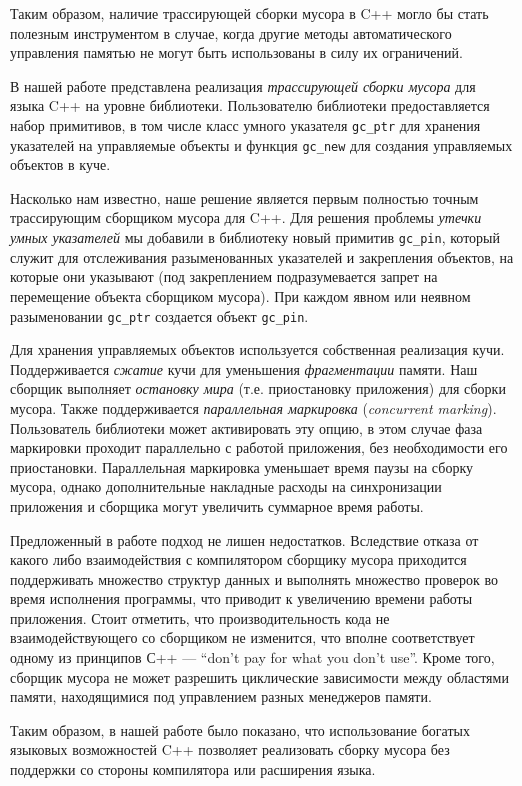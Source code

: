 \documentclass[10pt]{article}
\newcommand{\code}{\texttt}
\begin{document}
Таким образом, наличие трассирующей сборки мусора в C++
могло бы стать полезным инструментом в случае, 
когда другие методы автоматического управления памятью 
не могут быть использованы в силу их ограничений.

В нашей работе представлена реализация \emph{трассирующей сборки мусора} 
для языка C++ на уровне библиотеки. 
Пользователю библиотеки предоставляется набор примитивов, 
в том числе класс умного указателя \code{gc\_ptr} для хранения
указателей на управляемые объекты и 
функция \code{gc\_new} для создания управляемых объектов в куче.

Насколько нам известно, наше решение является первым
полностью точным трассирующим сборщиком мусора для C++.
Для решения проблемы \emph{утечки умных указателей}
мы добавили в библиотеку новый примитив \code{gc\_pin},
который служит для отслеживания разыменованных указателей
и закрепления объектов, на которые они указывают 
(под закреплением подразумевается запрет на перемещение объекта 
сборщиком мусора). При каждом явном или неявном разыменовании \code{gc\_ptr}
создается объект \code{gc\_pin}. 

Для хранения управляемых объектов используется собственная реализация кучи.
Поддерживается \emph{сжатие} кучи для уменьшения \emph{фрагментации} памяти.
Наш сборщик выполняет \emph{остановку мира} (т.е. приостановку приложения)
для сборки мусора. 
Также поддерживается \emph{параллельная маркировка} (\emph{concurrent marking}).
Пользователь библиотеки может активировать эту опцию,
в этом случае фаза маркировки проходит параллельно с работой приложения, 
без необходимости его приостановки. 
Параллельная маркировка уменьшает время паузы на сборку мусора, 
однако дополнительные накладные расходы на синхронизации приложения и сборщика
могут увеличить суммарное время работы.

Предложенный в работе подход не лишен недостатков. 
Вследствие отказа от какого либо взаимодействия с компилятором
сборщику мусора приходится поддерживать множество структур данных и выполнять 
множество проверок во время исполнения программы, 
что приводит к увеличению времени работы приложения.
Стоит отметить, что производительность кода не взаимодействующего со сборщиком не изменится, 
что вполне соответствует одному из принципов С++ --- ``don’t pay for what you don’t use''.
Кроме того, сборщик мусора не может разрешить циклические зависимости
между областями памяти, находящимися под управлением разных менеджеров памяти.

Таким образом, в нашей работе было показано, 
что использование богатых языковых возможностей C++ 
позволяет реализовать сборку мусора 
без поддержки со стороны компилятора или расширения языка.

\end{document}
